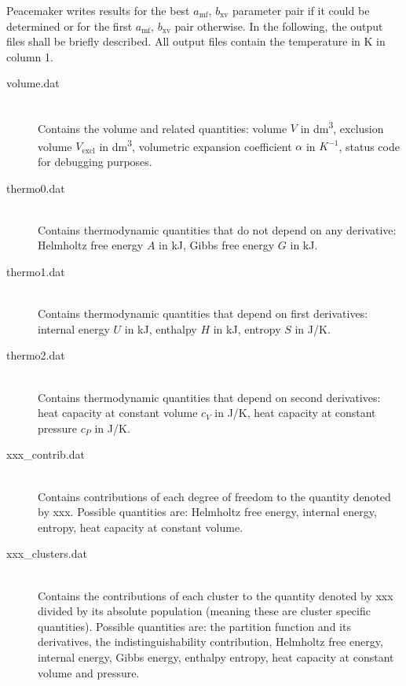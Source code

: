 \documentclass{scrartcl}
\newcommand{\amf}{a_\mathrm{mf}}
\newcommand{\bxv}{b_\mathrm{xv}}
\begin{document}
Peacemaker writes results for the best $\amf$, $\bxv$ parameter pair if it could be determined or for the first $\amf$, $\bxv$ pair otherwise.
In the following, the output files shall be briefly described.
All output files contain the temperature in \si{K} in column 1.

\begin{description}
    \item[volume.dat] \hfill \\
        Contains the volume and related quantities:
        volume $V$ in \si{dm^3}, exclusion volume $V_\mathrm{excl}$ in \si{dm^3}, volumetric expansion coefficient $\alpha$ in $\si{K^{-1}}$, status code for debugging purposes.
        \vspace{0.1cm}
    \item[thermo0.dat] \hfill \\
        Contains thermodynamic quantities that do not depend on any derivative:
        Helmholtz free energy $A$ in \si{kJ}, Gibbs free energy $G$ in \si{kJ}.
        \vspace{0.1cm}
    \item[thermo1.dat] \hfill \\
        Contains thermodynamic quantities that depend on first derivatives:
        internal energy $U$ in \si{kJ}, enthalpy $H$ in \si{kJ}, entropy $S$ in \si{J/K}.
        \vspace{0.1cm}
    \item[thermo2.dat] \hfill \\
        Contains thermodynamic quantities that depend on second derivatives:
        heat capacity at constant volume $c_V$ in \si{J/K}, heat capacity at constant pressure $c_P$ in \si{J/K}.
        \vspace{0.1cm}
    \item[xxx\_contrib.dat] \hfill \\
        Contains contributions of each degree of freedom to the quantity denoted by xxx.
        Possible quantities are: Helmholtz free energy, internal energy, entropy, heat capacity at constant volume.
        \vspace{0.1cm}
    \item[xxx\_clusters.dat] \hfill \\
        Contains the contributions of each cluster to the quantity denoted by xxx divided by its absolute population (meaning these are cluster specific quantities).
        Possible quantities are: the partition function and its derivatives, the indistinguishability contribution, Helmholtz free energy, internal energy, Gibbs energy, enthalpy entropy, heat capacity at constant volume and pressure.

\end{description}
\end{document}
